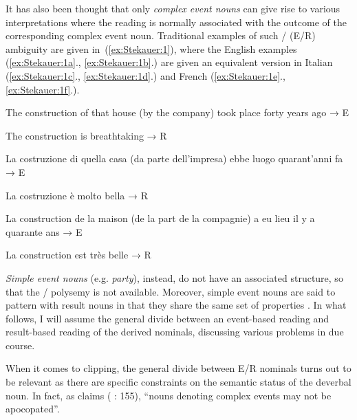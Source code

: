 \documentclass[output=paper]{langsci/langscibook}
\begin{document}
It has also been thought that only \emph{complex event nouns} can give
rise to various  interpretations where the  reading is
normally associated with the outcome of the corresponding complex event
noun. Traditional examples of such / (E/R) ambiguity are
given in~(\ref{ex:Stekauer:1}), where the English examples (\ref{ex:Stekauer:1a}., \ref{ex:Stekauer:1b}.) are given an
equivalent version in Italian (\ref{ex:Stekauer:1c}., \ref{ex:Stekauer:1d}.) and French (\ref{ex:Stekauer:1e}., \ref{ex:Stekauer:1f}.).

\begin{exe}
\ex\label{ex:Stekauer:1}
\begin{xlist}
\ex\label{ex:Stekauer:1a} {The construction of that house (by the company) took place
forty years ago} → E

\ex\label{ex:Stekauer:1b} {The construction is breathtaking} → R

\ex\label{ex:Stekauer:1c} {La costruzione di quella casa (da parte dell'impresa) ebbe
luogo quarant'anni fa} → E

\ex\label{ex:Stekauer:1d} {La costruzione è molto bella} → R

\ex\label{ex:Stekauer:1e} {La construction de la maison (de la part de la compagnie) a eu
lieu il y a quarante ans} → E

\ex\label{ex:Stekauer:1f} {La construction est très belle} → R
\end{xlist}
\end{exe}

\emph{Simple event nouns} (e.g. \emph{party}), instead, do not have
an associated  structure, so that the / polysemy is not
available. Moreover,  simple event nouns are said to pattern with
result nouns in that they share the same set of properties  %
\citep[see][24--25]{Melloni2011}%
%
. In what follows, I will assume the general divide between
an event-based reading and result-based reading of the derived nominals,
discussing various problems in due course.

When it comes to clipping, the general divide between E/R nominals turns
out to be relevant as there are specific constraints on the semantic
status of the deverbal noun. In fact, as 
\citeauthor{Kerleroux1997} %
%
claims 
(%
\citeyear{Kerleroux1997}%
%
: 155),
``nouns denoting complex events may not be apocopated''.
\end{document}
